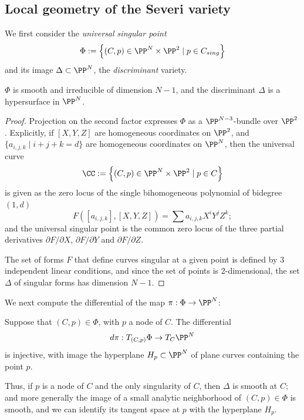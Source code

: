 \subsection{Local geometry of the Severi variety}\label{local severi geometry}

We first consider the \emph{universal singular point}
$$
\Phi := \left\{ (C, p) \in \PP^N \times \PP^2 \mid p \in C_{sing} \right\}
$$
and its image $\Delta\subset \PP^N$, the \emph{discriminant} variety. 

\begin{proposition}
 $\Phi$ is smooth and irreducible of dimension $N-1$, and the discriminant $\Delta$ is a hypersurface in $\PP^N$.
\end{proposition}
\begin{proof}
Projection on the second factor expresses $\Phi$ as a $\PP^{N-3}$-bundle over $\PP^2$. Explicitly, if $[X,Y,Z]$ are homogeneous coordinates on $\PP^2$, and $\{a_{i,j,k} \mid i+j+k = d \}$ are homogeneous coordinates on $\PP^N$, then the universal curve 
$$
\CC := \left\{ (C, p) \in \PP^N \times \PP^2 \mid p \in C \right\}
$$
is given as the zero locus of the single bihomogeneous polynomial of bidegree $(1, d)$
$$
F([a_{i,j,k}], [X,Y,Z] ) = \sum a_{i,j,k} X^iY^jZ^k;
$$
and the universal singular point is the common zero locus of the three partial derivatives $\partial F/\partial X$, $\partial F/\partial Y$ and  $\partial F/\partial Z$. 

The set of forms $F$ that define curves singular at a given point is defined by 3 independent linear conditions, and since the set of 
points is 2-dimensional, the set $\Delta$ of singular forms has dimension $N-1$.
\end{proof}
 
We next compute the differential of the map $\pi : \Phi \to \PP^N$:

\begin{lemma}\label{tangent space to discriminant}
Suppose that $(C,p)\in \Phi$, with $p$ a node of $C$.  The differential 
$$
d\pi : T_{(C,p)}\Phi \to T_C \PP^N
$$
is injective, with image the hyperplane $H_p \subset \PP^N$ of plane curves containing the point $p$.
\end{lemma}

Thus, if $p$ is a node of $C$ and the only singularity of $C$, then $\Delta$ is smooth at $C$; and more generally the image of a small analytic neighborhood of $(C,p) \in \Phi$ is smooth, and we can identify its tangent space at $p$ with the hyperplane $H_p$. 

